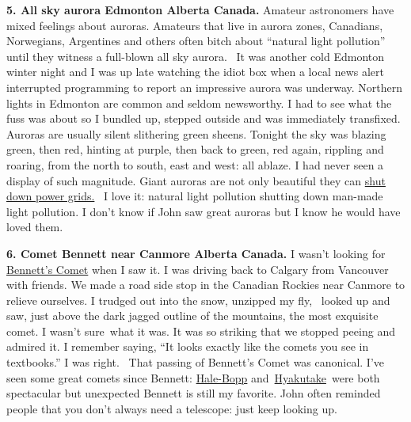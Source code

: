 \medskip

\textbf{5. All sky aurora Edmonton Alberta Canada.} Amateur astronomers
have mixed feelings about auroras. Amateurs that live in aurora zones,
Canadians, Norwegians, Argentines and others often bitch about ``natural
light pollution'' until they witness a full-blown all sky aurora.~ It
was another cold Edmonton winter night and I was up late watching the
idiot box when a local news alert interrupted programming to report an
impressive aurora was underway. Northern lights in Edmonton are common
and seldom newsworthy. I had to see what the fuss was about so I bundled
up, stepped outside and was immediately transfixed. Auroras are usually
silent slithering green sheens. Tonight the sky was blazing green, then
red, hinting at purple, then back to green, red again, rippling and
roaring, from the north to south, east and west: all ablaze. I had never
seen a display of such magnitude. Giant auroras are not only beautiful
they can \href{http://www.solarstorms.org/SWChapter1.html}{shut down
power grids.} ~I love it: natural light pollution shutting down man-made
light pollution. I don't know if John saw great auroras but I know he
would have loved them.

\medskip

\textbf{6. Comet Bennett near Canmore Alberta Canada.} I wasn't looking
for \href{https://en.wikipedia.org/wiki/Comet\_Bennett}{Bennett's Comet}
when I saw it. I was driving back to Calgary from Vancouver with
friends. We made a road side stop in the Canadian Rockies near Canmore
to relieve ourselves. I trudged out into the snow, unzipped my fly,
~looked up and saw, just above the dark jagged outline of the mountains,
the most exquisite comet. I wasn't sure~what it was. It was so striking
that we stopped peeing and admired it. I remember saying, ``It looks
exactly like the comets you see in textbooks.'' I was right.~ That
passing of Bennett's Comet was canonical. I've seen some great comets
since Bennett:
\href{https://en.wikipedia.org/wiki/Comet\_Hale\%E2\%80\%93Bopp}{Hale-Bopp}
and~\href{https://en.wikipedia.org/wiki/Comet\_Hyakutake}{Hyakutake}~were
both spectacular but unexpected Bennett is still my favorite. John often
reminded people that you don't always need a telescope: just keep
looking up.

\medskip

